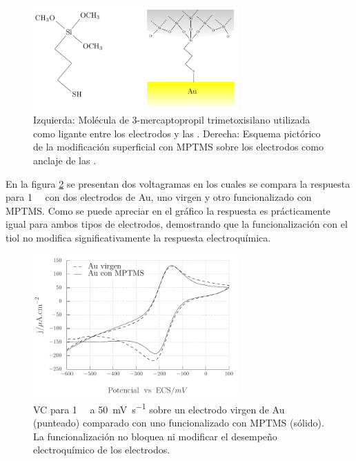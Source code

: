 			 \begin{figure}[!ht]
							\begin{center}
							\includegraphics[width=0.70\textwidth]{Esquemas/mod_sup.pdf}
							\caption[Modificación superficial de los electrodos.]{Izquierda: Molécula de  3-mercaptopropil trimetoxisilano utilizada como ligante entre los electrodos y las \pdm. Derecha: Esquema pictórico de la modificación superficial con MPTMS sobre los electrodos como anclaje de las \pdm.}
							\label{fig:mod_sup}
							\end{center}
							\end{figure}
										
			 En la figura \ref{fig:comparaciones_MPTMS-A} se presentan dos voltagramas en los cuales se compara la respuesta para \aminorutenio\space \SI{1}{\milli\Molar} con dos electrodos de Au, uno virgen y otro funcionalizado con MPTMS. Como se puede apreciar en el gráfico la respuesta es prácticamente igual para ambos tipos de electrodos, demostrando que la funcionalización con el tiol no modifica significativamente la respuesta electroquímica.

					\begin{figure}[!ht]
							\begin{center}
							\includegraphics[width=0.70\textwidth]{Graficos/Comparacion_Au-MPTMS.pdf}
							\caption[Comparación de electrodos con y sin MPTMS]{VC para \aminorutenio\space \SI{1}{\milli\Molar} a \SI{50}{\milli\volt\per\second} sobre un electrodo virgen de Au (punteado) comparado con uno funcionalizado con MPTMS (sólido). La funcionalización no bloquea ni modificar el desempeño electroquímico de los electrodos.}
							\label{fig:comparaciones_MPTMS-A}
							\end{center}
							\end{figure}

